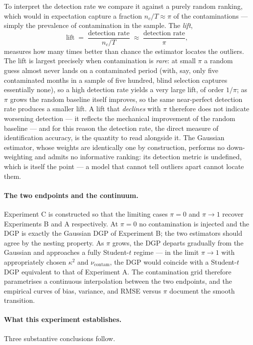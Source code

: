 \documentclass[11pt, a4paper, oneside]{article}
\begin{document}
To interpret the detection rate we compare it against a purely
random ranking, which would in expectation capture a fraction
$n_c / T \approx \pi$ of the contaminations — simply the
prevalence of contamination in the sample. The \emph{lift},
\[
\mathrm{lift} \;=\;
\frac{\text{detection rate}}{n_c / T}
\;\approx\;
\frac{\text{detection rate}}{\pi},
\]
measures how many times better than chance the estimator locates
the outliers. The lift is largest precisely when contamination is
\emph{rare}: at small $\pi$ a random guess almost never lands on a
contaminated period (with, say, only five contaminated months in
a sample of five hundred, blind selection captures essentially
none), so a high detection rate yields a very large
lift, of order $1/\pi$; as $\pi$ grows the random baseline itself
improves, so the same near-perfect detection rate produces a
smaller lift. A lift that \emph{declines} with $\pi$ therefore
does not indicate worsening detection — it reflects the mechanical
improvement of the random baseline — and for this reason the
detection rate, the direct measure of identification accuracy, is
the quantity to read alongside it. The Gaussian estimator, whose
weights are identically one by construction, performs no
down-weighting and admits no informative ranking: its detection
metric is undefined, which is itself the point — a model that
cannot tell outliers apart cannot locate them.

\paragraph{The two endpoints and the continuum.}
Experiment C is constructed so that the limiting cases $\pi = 0$
and $\pi \to 1$ recover Experiments B and A respectively. At
$\pi = 0$ no contamination is injected and the DGP is exactly the
Gaussian DGP of Experiment B; the two estimators should agree by
the nesting property. As $\pi$ grows, the DGP departs gradually
from the Gaussian and approaches a fully Student-$t$ regime — in
the limit $\pi \to 1$ with appropriately chosen $\kappa^2$ and
$\nu_{\mathrm{contam}}$, the DGP would coincide with a Student-$t$
DGP equivalent to that of Experiment A. The contamination grid
therefore parametrises a continuous interpolation between the two
endpoints, and the empirical curves of bias, variance, and RMSE
versus $\pi$ document the smooth transition.

\paragraph{What this experiment establishes.}
Three substantive conclusions follow.
\end{document}
